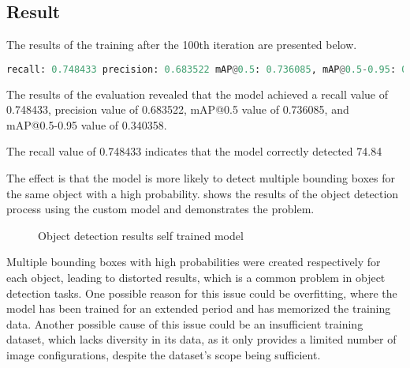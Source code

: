 \subsection{Result }

The results of the training after the 100th iteration are presented below.

\begin{lstlisting}[language=python]
    recall: 0.748433 precision: 0.683522 mAP@0.5: 0.736085, mAP@0.5-0.95: 0.340358
\end{lstlisting}

The results of the evaluation revealed that the model achieved a recall value of 0.748433, precision value of 0.683522, mAP@0.5 value of 0.736085, and mAP@0.5-0.95 value of 0.340358. 

The recall value of 0.748433 indicates that the model correctly detected 74.84%

The effect is that the model is more likely to detect multiple bounding boxes for the same object with a high probability.  shows the results of the object detection process using the custom model and demonstrates the problem. 

\begin{figure}[!h]
    \centering
    \caption{Object detection results self trained model }
    \label{fig:trained_model_results}
\end{figure}

Multiple bounding boxes with high probabilities were created respectively for each object, leading to distorted results, which is a common problem in object detection tasks. One possible reason for this issue could be overfitting, where the model has been trained for an extended period and has memorized the training data. Another possible cause of this issue could be an insufficient training dataset, which lacks diversity in its data, as it only provides a limited number of image configurations, despite the dataset's scope being sufficient.

